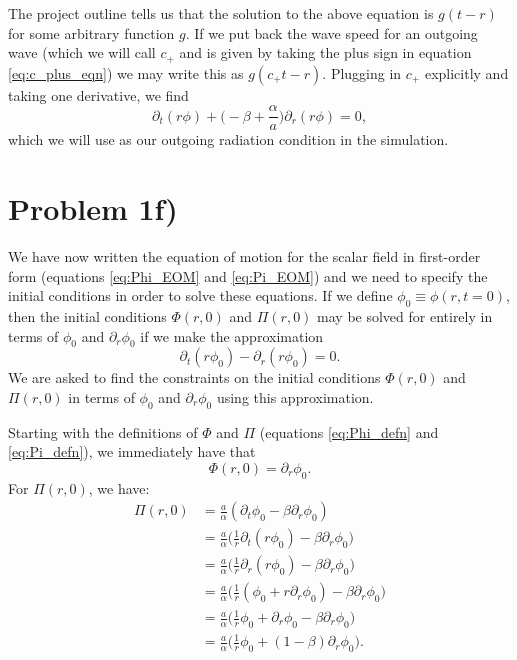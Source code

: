 \documentclass[12pt]{article}
\numberwithin{equation}{section}
\begin{document}
The project outline tells us that the solution to the above equation is $g(t - r)$ for some arbitrary function $g$.  If we put back the wave speed for an outgoing wave (which we will call $c_+$ and is given by taking the plus sign in equation \ref{eq:c_plus_eqn}) we may write this as $g(c_+ t - r)$.  Plugging in $c_+$ explicitly and taking one derivative, we find
\begin{equation} \label{eq:outgoing_radiation_eqn}
\partial_t (r \phi) + \Big( -\beta + \frac{\alpha}{a} \Big) \partial_r (r \phi) = 0,
\end{equation}
which we will use as our outgoing radiation condition in the simulation.

\section{Problem 1f)}
We have now written the equation of motion for the scalar field in first-order form (equations \ref{eq:Phi_EOM} and \ref{eq:Pi_EOM}) and we need to specify the initial conditions in order to solve these equations.  If we define $\phi_0 \equiv \phi(r, t = 0)$, then the initial conditions $\Phi(r, 0)$ and $\Pi(r, 0)$ may be solved for entirely in terms of $\phi_0$ and $\partial_r \phi_0$ if we make the approximation
\begin{equation}
\partial_t (r \phi_0) - \partial_r (r \phi_0) = 0.
\end{equation}
We are asked to find the constraints on the initial conditions $\Phi(r, 0)$ and $\Pi(r, 0)$ in terms of $\phi_0$ and $\partial_r \phi_0$ using this approximation.

Starting with the definitions of $\Phi$ and $\Pi$ (equations \ref{eq:Phi_defn} and \ref{eq:Pi_defn}), we immediately have that
\begin{equation} \label{eq:Phi_0}
\Phi(r, 0) = \partial_r \phi_0.
\end{equation}
For $\Pi(r, 0)$, we have:
\begin{equation} \label{eq:Pi_0}
\begin{aligned}
\Pi(r, 0) &= \frac{a}{\alpha} (\partial_t \phi_0 - \beta \partial_r \phi_0) \\
&= \frac{a}{\alpha} \Big( \frac{1}{r} \partial_t (r \phi_0) - \beta \partial_r \phi_0 \Big) \\
&= \frac{a}{\alpha} \Big( \frac{1}{r} \partial_r (r \phi_0) - \beta \partial_r \phi_0 \Big) \\
&= \frac{a}{\alpha} \Big( \frac{1}{r} (\phi_0 + r \partial_r \phi_0) - \beta \partial_r \phi_0 \Big) \\
&= \frac{a}{\alpha} \Big( \frac{1}{r} \phi_0 + \partial_r \phi_0 - \beta \partial_r \phi_0 \Big) \\
&= \frac{a}{\alpha} \Big( \frac{1}{r} \phi_0 + (1 - \beta) \partial_r \phi_0 \Big). \\
\end{aligned}
\end{equation}
\end{document}
